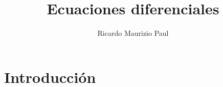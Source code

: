 \documentclass[a4paper, twoside, 11pt]{report}
\title{Ecuaciones diferenciales}
\author{Ricardo Maurizio Paul}
\begin{document}
\maketitle

\chapter{Introducción}

\end{document}

